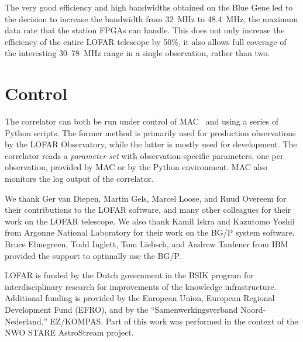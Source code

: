 The very good efficiency and high bandwidths obtained on the Blue Gene led
to the decision to increase the bandwidth from 32~MHz to 48.4~MHz, the
maximum data rate that the station FPGAs can handle.
This does not only increase the efficiency of the entire LOFAR telescope
by 50\%, it also allows full coverage of the interesting 30--78~MHz range
in a single observation, rather than two.


\section{Control}

The correlator can both be run under control of MAC~\cite{Overeem:10} and
using a series of Python scripts.
The former method is primarily used for production observations by the
LOFAR Observatory, while the latter is mostly used for development.
The correlator reads a \emph{parameter set\/} with observation-specific
parameters, one per observation, provided by MAC or by the Python environment.
MAC also monitors the log output of the correlator.


\begin{acknowledgements}
We thank Ger van Diepen, Martin Gels, Marcel Loose, and Ruud Overeem
for their contributions to the LOFAR software, and many other colleagues
for their work on the LOFAR telescope.
We also thank Kamil Iskra and Kazutomo Yoshii from Argonne National Laboratory
for their work on the BG/P system software.
Bruce Elmegreen, Todd Inglett, Tom Liebsch, and Andrew Taufener from IBM
provided the support to optimally use the BG/P.

LOFAR is funded by the Dutch government in the BSIK program for
interdisciplinary research for improvements of the knowledge
infrastructure.  Additional funding is provided by the European Union,
European Regional Development Fund (EFRO), and by the
``Samenwerkingsverband Noord-Nederland,'' EZ/KOMPAS. Part of this work was
performed in the context of the NWO STARE AstroStream project.
\end{acknowledgements}


%






